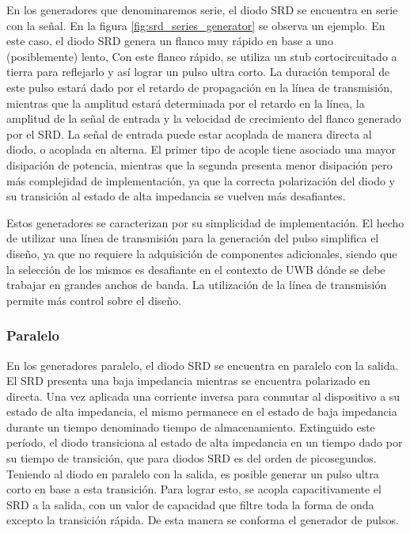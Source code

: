 En los generadores que denominaremos serie, el diodo SRD se encuentra en serie
con la señal. En la figura \ref{fig:srd_series_generator} se observa un ejemplo.
En este caso, el diodo SRD genera un flanco muy rápido en base a uno
(posiblemente) lento, Con este flanco rápido, se utiliza un stub cortocircuitado
a tierra para reflejarlo y así lograr un pulso ultra corto. La duración temporal
de este pulso estará dado por el retardo de propagación en la línea de
transmisión, mientras que la amplitud estará determinada por el retardo en la
línea, la amplitud de la señal de entrada y la velocidad de crecimiento del
flanco generado por el SRD. La señal de entrada puede estar acoplada de manera
directa al diodo, o acoplada en alterna. El primer tipo de acople tiene asociado
una mayor disipación de potencia, mientras que la segunda presenta menor
disipación pero más complejidad de implementación, ya que la correcta
polarización del diodo y su transición al estado de alta impedancia se vuelven
más desafiantes.

Estos generadores se caracterizan por su simplicidad de implementación. El hecho
de utilizar una línea de transmisión para la generación del pulso simplifica el
diseño, ya que no requiere la adquisición de componentes adicionales, siendo que
la selección de los mismos es desafiante en el contexto de UWB dónde se debe
trabajar en grandes anchos de banda. La utilización de la línea de transmisión
permite más control sobre el diseño.

\subsubsection{Paralelo}

En los generadores paralelo, el diodo SRD se encuentra en paralelo con la
salida. El SRD presenta una baja impedancia mientras se encuentra polarizado en
directa. Una vez aplicada una corriente inversa para conmutar al dispositivo a
su estado de alta impedancia, el mismo permanece en el estado de baja impedancia
durante un tiempo denominado tiempo de almacenamiento. Extinguido este período,
el diodo transiciona al estado de alta impedancia en un tiempo dado por su
tiempo de transición, que para diodos SRD es del orden de picosegundos. Teniendo
al diodo en paralelo con la salida, es posible generar un pulso ultra corto en
base a esta transición. Para lograr esto, se acopla capacitivamente el SRD a la
salida, con un valor de capacidad que filtre toda la forma de onda excepto la
transición rápida. De esta manera se conforma el generador de pulsos.

